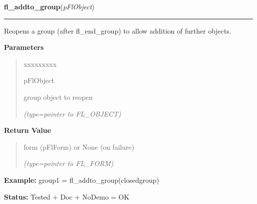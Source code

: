 \hspace{.8\funcindent}\begin{boxedminipage}{\funcwidth}

    \raggedright \textbf{fl\_addto\_group}(\textit{pFlObject})

    \vspace{-1.5ex}

    \rule{\textwidth}{0.5\fboxrule}
\setlength{\parskip}{2ex}
    Reopens a group (after fl\_end\_group) to allow addition of further 
    objects.

\setlength{\parskip}{1ex}
      \textbf{Parameters}
      \vspace{-1ex}

      \begin{quote}
        \begin{Ventry}{xxxxxxxxx}

          \item[pFlObject]

          group object to reopen

            {\it (type=pointer to FL\_OBJECT)}

        \end{Ventry}

      \end{quote}

      \textbf{Return Value}
    \vspace{-1ex}

      \begin{quote}
      form (pFlForm) or None (on failure)

      {\it (type=pointer to FL\_FORM)}

      \end{quote}

\textbf{Example:} group1 = fl\_addto\_group(closedgroup)



\textbf{Status:} Tested + Doc + NoDemo = OK



    \end{boxedminipage}

    \label{xformslib:flbasic:fl_get_object_objclass}

    \vspace{0.5ex}

